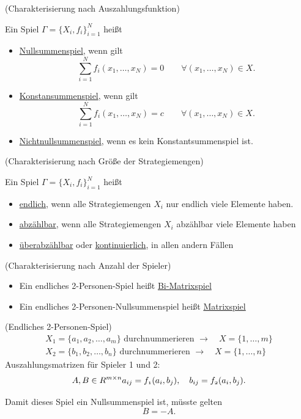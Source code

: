 \begin{definition} (Charakterisierung nach Auszahlungsfunktion)

	Ein Spiel $\Gamma=\{X_i, f_i\}_{i=1}^N$ heißt
	\begin{itemize}
		\item \underline{Nullsummenspiel}, wenn gilt
			\[
				\sum_{i=1}^N f_i(x_1, \ldots, x_N)=0 \qquad \forall (x_1, \ldots, x_N) \in X
			.\] 
		\item \underline{Konstansummenspiel}, wenn gilt
			\[
				\sum_{i=1}^N f_i(x_1, \ldots, x_N)=c \qquad \forall (x_1, \ldots, x_N) \in X
			.\] 
		\item \underline{Nichtnullsummenspiel}, wenn es kein Konstantsummenspiel ist.
	\end{itemize}
\end{definition}

\begin{definition} (Charakterisierung nach Größe der Strategiemengen) 

	Ein Spiel $\Gamma=\{X_i, f_i\}_{i=1}^N$ heißt
	\begin{itemize}
		\item \underline{endlich}, wenn alle Strategiemengen $X_i$ nur endlich viele Elemente haben.
		\item \underline{abzählbar}, wenn alle Strategiemengen $X_i$ abzählbar viele Elemente haben
		\item \underline{überabzählbar} oder \underline{kontinuierlich}, in allen andern Fällen
	\end{itemize}
\end{definition}

\begin{definition} (Charakterisierung nach Anzahl der Spieler)
	\begin{itemize}
		\item Ein endliches 2-Personen-Spiel heißt \underline{Bi-Matrixspiel} 
		\item Ein endliches 2-Personen-Nullsummenspiel heißt \underline{Matrixspiel} 
	\end{itemize}
\end{definition}

\begin{beispiel}
	(Endliches 2-Personen-Spiel)
	\begin{align*}
		X_1 = \{a_1, a_2, \ldots, a_m\} \text{ durchnummerieren } \rightarrow \quad X=\{1,\ldots,m\} \\
		X_2 = \{b_1, b_2, \ldots, b_n\} \text{ durchnummerieren } \rightarrow \quad X=\{1,\ldots,n\} 
	\end{align*}
Auszahlungsmatrizen für Spieler 1 und 2: \[A, B \in R^{m \times n} \mit a_{ij} = f_1(a_i, b_j), \quad b_{ij} = f_2(a_i, b_j)
.\]

Damit dieses Spiel ein Nullsummenspiel ist, müsste gelten \[
B = -A
.\] 
\end{beispiel}

